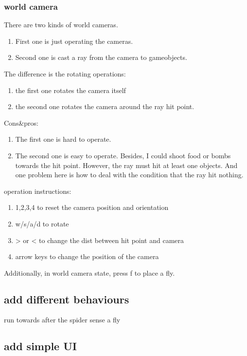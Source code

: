 \documentclass[11pt]{article}
\begin{document}
\subsubsection{world camera}
\label{sec-1-1-3}
There are two kinds of world cameras.
\begin{enumerate}
\item First one is just operating the cameras.
\item Second one is cast a ray from the camera to gameobjects.
\end{enumerate}
The difference is the rotating operations:
\begin{enumerate}
\item the first one rotates the camera itself
\item the second one rotates the camera around the ray hit point.
\end{enumerate}
Cons\&pros:
\begin{enumerate}
\item The first one is hard to operate.
\item The second one is easy to operate. Besides, I could shoot food or bombs towards the hit point. 
However, the ray must hit at least one objects. And one problem here is how to deal with the condition that the ray hit nothing.
\end{enumerate}
operation instructions:
\begin{enumerate}
\item 1,2,3,4 to reset the camera position and orientation
\item w/s/a/d to rotate
\item > or < to change the dist between hit point and camera
\item arrow keys to change the position of the camera
\end{enumerate}

Additionally, in world camera state, press f to place a fly.

\subsection{add different behaviours}
\label{sec-1-2}
run towards after the spider sense a fly
\subsection{add simple UI}
\label{sec-1-3}
\end{document}
